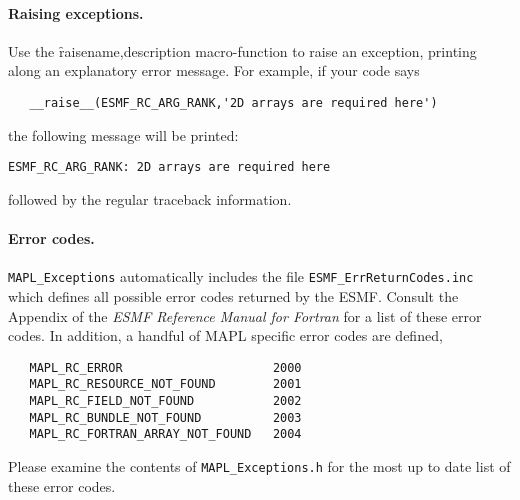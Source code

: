 \paragraph{Raising exceptions.} Use the \f{raise}{name,description}
macro-function to raise an exception, printing along an explanatory
error message. For example, if your code says
\begin{verbatim}
   __raise__(ESMF_RC_ARG_RANK,'2D arrays are required here')
\end{verbatim}
the following message will be printed:
\begin{verbatim}
ESMF_RC_ARG_RANK: 2D arrays are required here
\end{verbatim}
followed by the regular traceback information.

\paragraph{Error codes.} {\tt MAPL\_Exceptions} automatically includes
the file {\tt ESMF\_ErrReturnCodes.inc} which defines all possible
error codes returned by the ESMF. Consult the Appendix of the {\em ESMF
Reference Manual for Fortran} for a list of these error codes. In
addition, a handful of MAPL specific error codes are defined,
\begin{verbatim}
   MAPL_RC_ERROR                     2000
   MAPL_RC_RESOURCE_NOT_FOUND        2001
   MAPL_RC_FIELD_NOT_FOUND           2002
   MAPL_RC_BUNDLE_NOT_FOUND          2003
   MAPL_RC_FORTRAN_ARRAY_NOT_FOUND   2004
\end{verbatim}
Please examine the contents of {\tt MAPL\_Exceptions.h} for the most up
to date list of these error codes.





